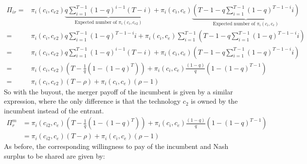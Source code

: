 \documentclass[12pt]{report}
\numberwithin{equation}{section}
\begin{document}
\begin{align*}
\Pi_{ir} =& \pi_{i}(c_i,c_{e2}) \underbrace{q \sum_{i=1}^{T-1} (1-q)^{i-1} (T-i)}_{\text{Expected number of } \pi_{i}(c_i,c_{e2})}+ \pi_i(c_i,c_e) \underbrace{ (T-1-q \sum_{i=1}^{T-1} (1-q)^{T-1-i} i)}_{\text{Expected number of } \pi_{i}(c_i,c_{e})}
\\
=& \pi_{i}(c_i,c_{e2}) q \sum_{i=1}^{T-1} (1-q)^{T-1-i} i + \pi_i(c_i,c_e)  \sum_{i=1}^{T-1} (T-1-q \sum_{i=1}^{T-1} (1-q)^{T-1-i} i)
\\ =& \pi_{i}(c_i,c_{e2})q \sum_{i=1}^{T-1} (1-q)^{i-1} (T-i)+ \pi_i(c_i,c_e) (T-1-q \sum_{i=1}^{T-1} (1-q)^{T-1-i} i)
\\ =&\pi_{i}(c_i,c_{e2}) \left( T - \frac{1}{q} \left( 1-(1-q)^{T} \right) \right)
+ \pi_i(c_i,c_e) \frac{(1-q)}{q} \left( 1-(1-q)^{T-1} \right) \\ 
=&\pi_{i}(c_i,c_{e2}) \left( T - \rho \right)
+ \pi_i(c_i,c_e)  \left( \rho - 1 \right)
\end{align*}
So with the buyout, the merger payoff of the incumbent is given by a similar expression, where the only difference is that the technology $c_2$ is owned by the incumbent instead of the entrant. 
\begin{align*}
\Pi^m_r &= \pi_{i}(c_{i2},c_{e}) \left( T - \frac{1}{q} \left( 1-(1-q)^{T} \right) \right)
+\pi_i(c_i,c_e) \frac{(1-q)}{q} \left( 1-(1-q)^{T-1} \right) \\
&=\pi_{i}(c_{i2},c_{e}) \left( T - \rho \right)
+\pi_i(c_i,c_e) (\rho-1)
\end{align*}
As before, the corresponding willingness to pay of the incumbent and Nash surplus to be shared are given by: 
\end{document}
